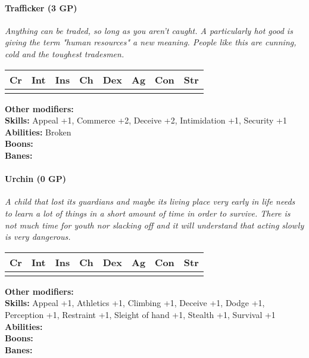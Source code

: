 \hrulefill
\paragraph*{Trafficker (3 GP)}
\textit{Anything can be traded, so long as you aren't caught. A particularly hot good is giving the term "human resources" a new meaning. People like this are cunning, cold and the toughest tradesmen.}\par
\begin{tabular}{|l|l|l|l|l|l|l|l|}
	\hline
	Cr & Int & Ins & Ch & Dex & Ag & Con & Str \\ \hline
	&  &  &  &  &  &  &  \\ \hline
\end{tabular}\par
\noindent\textbf{Other modifiers:} \\
\textbf{Skills:} Appeal +1,
Commerce +2,
Deceive +2,
Intimidation +1,
Security +1\\
\textbf{Abilities:} Broken\\
\textbf{Boons:} \\
\textbf{Banes:}

\hrulefill
\paragraph*{Urchin (0 GP)}
\textit{A child that lost its guardians and maybe its living place very early in life needs to learn a lot of things in a short amount of time in order to survive. There is not much time for youth nor slacking off and it will understand that acting slowly is very dangerous.}\par
\begin{tabular}{|l|l|l|l|l|l|l|l|}
	\hline
	Cr & Int & Ins & Ch & Dex & Ag & Con & Str \\ \hline
	&  &  &  &  &  &  &  \\ \hline
\end{tabular}\par
\noindent\textbf{Other modifiers:} \\
\textbf{Skills:} Appeal +1,
Athletics +1,
Climbing +1,
Deceive +1,
Dodge +1,
Perception +1,
Restraint +1,
Sleight of hand +1,
Stealth +1,
Survival +1\\
\textbf{Abilities:} \\
\textbf{Boons:} \\
\textbf{Banes:} \\

\hrulefill
